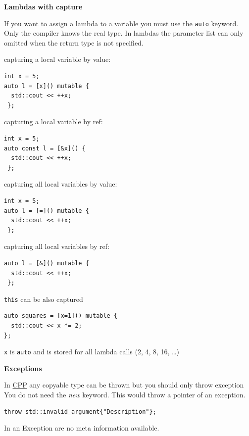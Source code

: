 \documentclass[11pt,twoside,landscape]{article}
\begin{document}
\begin{multicols}{3}
\textbf{Lambdas with capture}

If you want to assign a lambda to a variable you must use the \texttt{auto} keyword. Only the compiler knows the real type. 
In lambdas the parameter list can only omitted when the return type is not specified.

capturing a local variable by value:
\lstset{language=c++,label= ,caption= ,captionpos=b,numbers=none}
\begin{lstlisting}
int x = 5;
auto l = [x]() mutable {
  std::cout << ++x;
 };
\end{lstlisting}

capturing a local variable by ref:
\lstset{language=c++,label= ,caption= ,captionpos=b,numbers=none}
\begin{lstlisting}
int x = 5;
auto const l = [&x]() {
  std::cout << ++x;
 }; 
\end{lstlisting}

capturing all local variables by value:
\lstset{language=c++,label= ,caption= ,captionpos=b,numbers=none}
\begin{lstlisting}
int x = 5;
auto l = [=]() mutable {
  std::cout << ++x;
 };
\end{lstlisting}

capturing all local variables by ref:
\lstset{language=c++,label= ,caption= ,captionpos=b,numbers=none}
\begin{lstlisting}
auto l = [&]() mutable {
  std::cout << ++x;
 };
\end{lstlisting}

\texttt{this} can be also captured


\lstset{language=c++,label= ,caption= ,captionpos=b,numbers=none}
\begin{lstlisting}
auto squares = [x=1]() mutable {
  std::cout << x *= 2;
};
\end{lstlisting}
\texttt{x} is \texttt{auto} and is stored for all lambda calls (2, 4, 8, 16, \ldots{})

\textbf{Exceptions}

In \href{../../../roam/20210920103243-c.org}{CPP} any copyable type can be thrown but you should only throw exception
You do not need the \emph{new} keyword. This would throw a pointer of an exception.
\lstset{language=c++,label= ,caption= ,captionpos=b,numbers=none}
\begin{lstlisting}
throw std::invalid_argument{"Description"};
\end{lstlisting}

In an Exception are no meta information available. 



\end{multicols}
\end{document}
